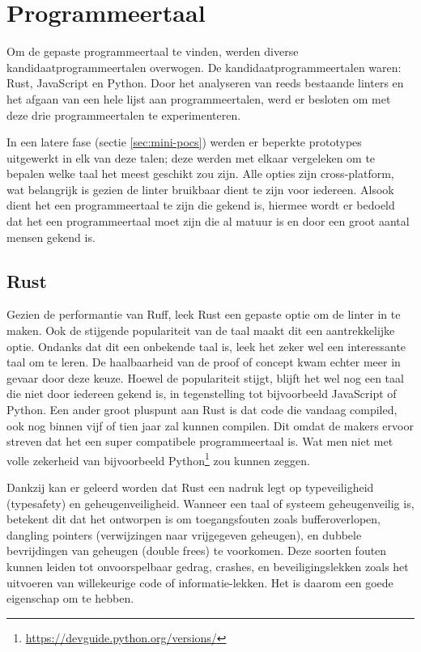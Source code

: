 \section{Programmeertaal}

Om de gepaste programmeertaal te vinden, werden diverse kandidaatprogrammeertalen overwogen. De kandidaatprogrammeertalen waren: Rust, JavaScript en Python. Door het analyseren van reeds bestaande linters en het afgaan van een hele lijst aan programmeertalen, werd er besloten om met deze drie programmeertalen te experimenteren.

In een latere fase (sectie \ref{sec:mini-pocs}) werden er beperkte prototypes uitgewerkt in elk van deze talen; deze werden met elkaar vergeleken om te bepalen welke taal het meest geschikt zou zijn. Alle opties zijn cross-platform, wat belangrijk is gezien de linter bruikbaar dient te zijn voor iedereen. Alsook dient het een programmeertaal te zijn die gekend is, hiermee wordt er bedoeld dat het een programmeertaal moet zijn die al matuur is en door een groot aantal mensen gekend is.

\subsection{Rust}
Gezien de performantie van Ruff, leek Rust een gepaste optie om de linter in te maken. Ook de stijgende populariteit van de taal maakt dit een aantrekkelijke optie. Ondanks dat dit een onbekende taal is, leek het zeker wel een interessante taal om te leren. De haalbaarheid van de proof of concept kwam echter meer in gevaar door deze keuze. Hoewel de populariteit stijgt, blijft het wel nog een taal die niet door iedereen gekend is, in tegenstelling tot bijvoorbeeld JavaScript of Python. Een ander groot pluspunt aan Rust is dat code die vandaag compiled, ook nog binnen vijf of tien jaar zal kunnen compilen. Dit omdat de makers ervoor streven dat het een super compatibele programmeertaal is. Wat men niet met volle zekerheid van bijvoorbeeld Python\footnote{\url{https://devguide.python.org/versions/}} zou kunnen zeggen.

Dankzij \textcite{Klabnik2022} kan er geleerd worden dat Rust een nadruk legt op typeveiligheid (typesafety) en geheugenveiligheid. Wanneer een taal of systeem geheugenveilig is, betekent dit dat het ontworpen is om toegangsfouten zoals bufferoverlopen, dangling pointers (verwijzingen naar vrijgegeven geheugen), en dubbele bevrijdingen van geheugen (double frees) te voorkomen. Deze soorten fouten kunnen leiden tot onvoorspelbaar gedrag, crashes, en beveiligingslekken zoals het uitvoeren van willekeurige code of informatie-lekken. Het is daarom een goede eigenschap om te hebben.

